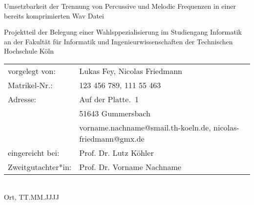 \begin{titlepage}
%
\sffamily%
%
\begin{center}
\end{center}
%
\vfill
%
\begin{huge}
Umsetzbarkeit der Trennung von Percussive und Melodic Frequenzen in einer bereits komprimierten Wav Datei\\[10mm]
\end{huge}
%
Projektteil der Belegung einer Wahlsppezialisierung\newline
im Studiengang Informatik\newline
an der Fakultät für Informatik und Ingenieurwissenschaften\newline
der Technischen Hochschule Köln
%
\vfill
%
\begin{tabular}{@{}ll}
vorgelegt von: & Lukas Fey, Nicolas Friedmann\\
Matrikel-Nr.:  & 123 456 789, 111 55 463\\
Adresse:       & Auf der Platte.~1\\
               & 51643 Gummersbach\\
               & vorname.nachname@smail.th-koeln.de, nicolas-friedmann@gmx.de\\[5mm]
eingereicht bei:   & Prof. Dr. Lutz Köhler\\
Zweitgutachter*in: & Prof. Dr. Vorname Nachname
\end{tabular}	
%
\\[10mm]
%
Ort, TT.MM.JJJJ%
%
\rmfamily%
%
\end{titlepage}